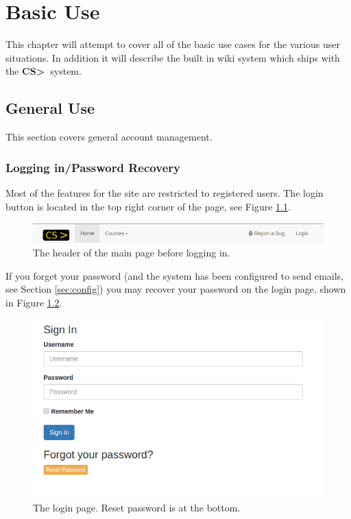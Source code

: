 \documentclass[11pt]{report}
\newcommand{\csgt}[0]{\textbf{CS\textgreater\ }}
\begin{document}
\chapter{Basic Use}
\label{ch:use}
This chapter will attempt to cover all of the basic use cases for the various user situations.
In addition it will describe the built in wiki system which ships with the \csgt system.

\section{General Use}
This section covers general account management.
\subsection{Logging in/Password Recovery}
Most of the features for the site are restricted to registered users. The login button is located in the
top right corner of the page, see Figure \ref{fig:main_page}.

\begin{figure}
\centering
\includegraphics[width=\textwidth,height=\textheight,keepaspectratio]{diagrams/main_page}
\caption{The header of the main page before logging in.}
\label{fig:main_page}
\end{figure}

If you forget your password (and the system has been configured to send emails, see Section \ref{sec:config})
you may recover your password on the login page, shown in Figure \ref{fig:login_page}.

\begin{figure}
\centering
\includegraphics[width=\textwidth,height=\textheight,keepaspectratio]{diagrams/login_page}
\caption{The login page. Reset password is at the bottom.}
\label{fig:login_page}
\end{figure}
\end{document}

